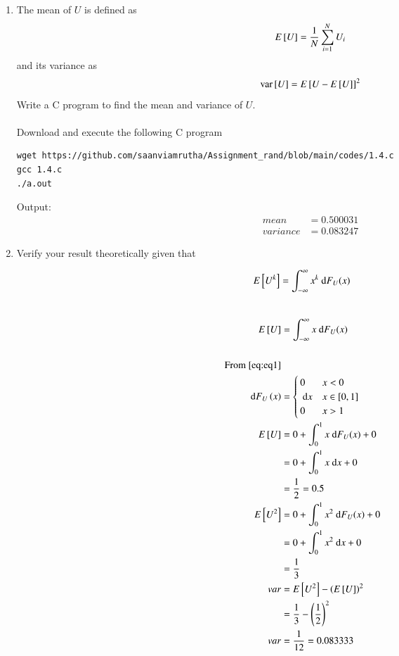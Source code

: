 \documentclass[journal,12pt,twocolumn]{IEEEtran}
\renewcommand\thesection{\arabic{section}}
\begin{document}
\begin{enumerate}[label=\thesection.\arabic*
,ref=\thesection.\theenumi]
\item
The mean of $U$ is defined as
%
\begin{equation}
E{}\left[U\right] = \frac{1}{N}\sum_{i=1}^{N}U_i
\end{equation}
%
and its variance as
%
\begin{equation}
\text{var}{}\left[U\right] = E{}\left[U- E{}\left[U\right]\right]^2 
\end{equation}
Write a C program to  find the mean and variance of $U$. 
\\ \solution\\
Download and execute the following C program
\begin{lstlisting}
wget https://github.com/saanviamrutha/Assignment_rand/blob/main/codes/1.4.c
gcc 1.4.c
./a.out
\end{lstlisting}
Output:\\
\begin{align}
mean&=0.500031 \\
variance&=0.083247 
\end{align}
\item Verify your result theoretically given that
\end{enumerate}
%
\begin{equation}
E{}\left[U^k\right] = \int_{-\infty}^{\infty}x^k ~\mathrm{d}F_{U}(x)
\end{equation}
\solution \\
\begin{align}
    E{}\left[U\right] &= \int_{-\infty}^{\infty}x ~\mathrm{d}F_{U}(x)\\\\
    \text{From} ~\eqref{eq:eq1}\\
   ~\mathrm{d}F_U\left(x\right)&=
                 \begin{cases}
                 0 & x<0\\
                 ~\mathrm{d}x & x\in [0,1]\\
                 0 & x>1
                 \end{cases}\\
    E{}\left[U\right] &= 0+ \int_{0}^{1}x ~\mathrm{d}F_{U}(x)+0  \\
    &=0+\int_{0}^{1}x ~\mathrm{d}x+0\\
    &=\frac{1}{2}=0.5\\
     E{}\left[U^2\right] &= 0+ \int_{0}^{1}x^2 ~\mathrm{d}F_{U}(x)+0  \\
    &=0+\int_{0}^{1}x^2 ~\mathrm{d}x+0\\
    &=\frac{1}{3}\\
    var&=E{}\left[U^2\right]-\left(E{}\left[U\right]\right)^2\\
    &=\frac{1}{3}-\left(\frac{1}{2}\right)^2\\
    var&=\frac{1}{12}=0.083333
\end{align}
\end{document}
